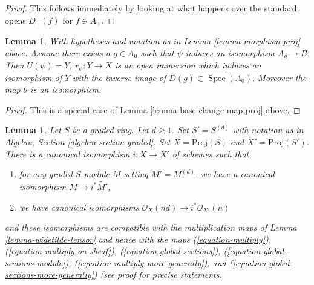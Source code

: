 \documentclass{stacks-project}
\theoremstyle{plain}
\newtheorem{lemma}[subsection]{Lemma}
\theoremstyle{definition}
\theoremstyle{remark}
\numberwithin{equation}{subsection}
\def\Spec{\mathop{\mathrm{Spec}}}
\begin{document}
\begin{proof}
This follows immediately by looking at what happens over the standard
opens $D_{+}(f)$ for $f \in A_{+}$.
\end{proof}

\begin{lemma}
\label{lemma-localization-map-proj}
With hypotheses and notation as in Lemma \ref{lemma-morphism-proj} above.
Assume there exists a $g \in A_0$ such that $\psi$ induces an
isomorphism $A_g \to B$. Then
$U(\psi) = Y$, $r_\psi : Y \to X$ is an open immersion
which induces an isomorphism of $Y$ with the inverse image
of $D(g) \subset \Spec(A_0)$. Moreover the map $\theta$
is an isomorphism.
\end{lemma}

\begin{proof}
This is a special case of Lemma \ref{lemma-base-change-map-proj} above.
\end{proof}

\begin{lemma}
\label{lemma-d-uple}
Let $S$ be a graded ring. Let $d \geq 1$. Set $S' = S^{(d)}$ with notation
as in Algebra, Section \ref{algebra-section-graded}. Set
$X = \text{Proj}(S)$ and $X' = \text{Proj}(S')$. There is a canonical
isomorphism $i : X \to X'$ of schemes such that
\begin{enumerate}
\item for any graded $S$-module $M$ setting $M' = M^{(d)}$,
we have a canonical isomorphism $\widetilde{M} \to i^*\widetilde{M'}$,
\item we have canonical isomorphisms
$\mathcal{O}_{X}(nd) \to i^*\mathcal{O}_{X'}(n)$
\end{enumerate}
and these isomorphisms are compatible with the multiplication maps
of Lemma \ref{lemma-widetilde-tensor} and hence with the maps
(\ref{equation-multiply}),
(\ref{equation-multiply-on-sheaf}),
(\ref{equation-global-sections}),
(\ref{equation-global-sections-module}),
(\ref{equation-multiply-more-generally}), and
(\ref{equation-global-sections-more-generally}) (see proof for precise
statements.
\end{lemma}
\end{document}
